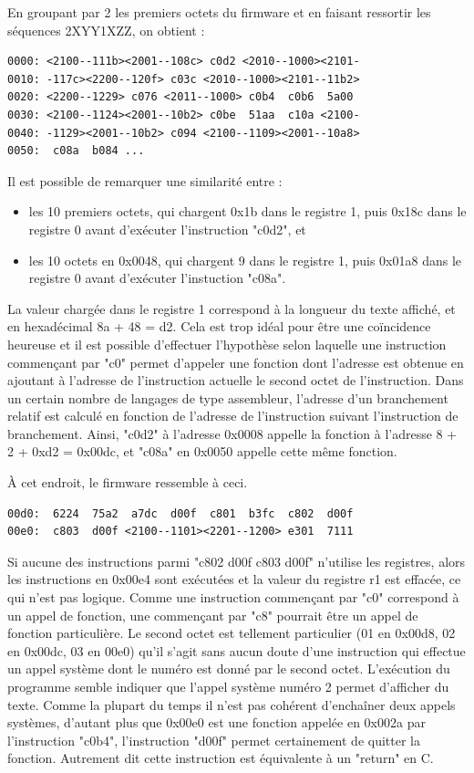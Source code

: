 \documentclass[a4paper,10pt]{article}
\begin{document}
En groupant par 2 les premiers octets du firmware et en faisant ressortir les séquences 2XYY1XZZ, on obtient :
\begin{verbatim}
0000: <2100--111b><2001--108c> c0d2 <2010--1000><2101-
0010: -117c><2200--120f> c03c <2010--1000><2101--11b2>
0020: <2200--1229> c076 <2011--1000> c0b4  c0b6  5a00
0030: <2100--1124><2001--10b2> c0be  51aa  c10a <2100-
0040: -1129><2001--10b2> c094 <2100--1109><2001--10a8>
0050:  c08a  b084 ...
\end{verbatim}

Il est possible de remarquer une similarité entre :
\begin{itemize}
\item les 10 premiers octets, qui chargent 0x1b dans le registre 1, puis 0x18c dans le registre 0 avant d'exécuter l'instruction "c0d2", et
\item les 10 octets en 0x0048, qui chargent 9 dans le registre 1, puis 0x01a8 dans le registre 0 avant d'exécuter l'instuction "c08a".
\end{itemize}

La valeur chargée dans le registre 1 correspond à la longueur du texte affiché, et en hexadécimal 8a + 48 = d2. Cela est trop idéal pour être une coïncidence heureuse et il est possible d'effectuer l'hypothèse selon laquelle une instruction commençant par "c0" permet d'appeler une fonction dont l'adresse est obtenue en ajoutant à l'adresse de l'instruction actuelle le second octet de l'instruction. Dans un certain nombre de langages de type assembleur, l'adresse d'un branchement relatif est calculé en fonction de l'adresse de l'instruction suivant l'instruction de branchement. Ainsi, "c0d2" à l'adresse 0x0008 appelle la fonction à l'adresse 8 + 2 + 0xd2 = 0x00dc, et "c08a" en 0x0050 appelle cette même fonction.

À cet endroit, le firmware ressemble à ceci.
\begin{verbatim}
00d0:  6224  75a2  a7dc  d00f  c801  b3fc  c802  d00f
00e0:  c803  d00f <2100--1101><2201--1200> e301  7111
\end{verbatim}

Si aucune des instructions parmi "c802 d00f c803 d00f" n'utilise les registres, alors les instructions en 0x00e4 sont exécutées et la valeur du registre r1 est effacée, ce qui n'est pas logique. Comme une instruction commençant par "c0" correspond à un appel de fonction, une commençant par "c8" pourrait être un appel de fonction particulière. Le second octet est tellement particulier (01 en 0x00d8, 02 en 0x00dc, 03 en 00e0) qu'il s'agit sans aucun doute d'une instruction qui effectue un appel système dont le numéro est donné par le second octet. L'exécution du programme semble indiquer que l'appel système numéro 2 permet d'afficher du texte. Comme la plupart du temps il n'est pas cohérent d'enchaîner deux appels systèmes, d'autant plus que 0x00e0 est une fonction appelée en 0x002a par l'instruction "c0b4", l'instruction "d00f" permet certainement de quitter la fonction. Autrement dit cette instruction est équivalente à un "return" en C.
\end{document}
